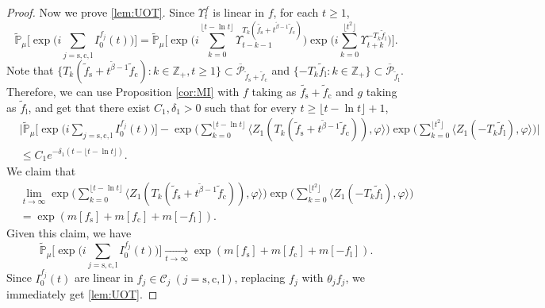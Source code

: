 \documentclass[12pt,a4paper]{amsart}
\theoremstyle{plain}
\theoremstyle{definition}
\numberwithin{equation}{section}
\begin{document}
\begin{proof}
	Now we prove \eqref{lem:UOT}.
	Since $\Upsilon_t^f$ is linear in $f$, for each $t\geq 1$,
\[
	\widetilde{\mathbb P}_{\mu}\Big[\exp\Big(i \sum_{j=\mathrm s,\mathrm c,\mathrm l}I_0^{f_j}(t)\Big)\Big]
	= \widetilde{\mathbb P}_{\mu}\Big[\exp\Big(i\sum_{k=0}^{\lfloor t-\ln t \rfloor}\Upsilon_{t-k-1}^{T_k(\tilde{f_\mathrm s}+t^{\tilde{\beta}-1} \tilde{f}_{\mathrm c})}\Big)\exp\Big(i\sum_{k=0}^{\lfloor t^2 \rfloor}\Upsilon_{t+k}^{-T_k\tilde{f}_{\mathrm l}}\Big)\Big].
\]
	Note that $\{T_k(\tilde f_\mathrm s + t^{\tilde\beta - 1}\tilde f_{\mathrm c}):k\in \mathbb Z_+, t\geq 1\}\subset \overline{\mathcal P}_{\tilde f_\mathrm s + \tilde f_{\mathrm c}}$ and $\{-T_k\tilde{f}_{\mathrm l}: k\in \mathbb Z_+\}\subset \overline{\mathcal P}_{\tilde f_\mathrm l}$.
	Therefore, we can use Proposition \ref{cor:MI} with $f$ taking as $\tilde{f_\mathrm s}+ \tilde{f}_{\mathrm c}$ and $g$ taking as $\tilde{f}_{\mathrm l}$, and get that there exist $C_1,\delta_1 > 0$ such that for every $t\geq \lfloor t - \ln t\rfloor +1$, 
  \begin{align}
    &\Big|\widetilde{\mathbb P}_{\mu}\Big[\exp\Big(i \sum_{j=\mathrm s,\mathrm c,\mathrm l}I_0^{f_j}(t)\Big)\Big]
    -\exp\Big(\sum_{k=0}^{\lfloor t-\ln t \rfloor} \langle Z_1(T_{k}(\tilde f_\mathrm s+t^{\tilde{\beta}-1}\tilde{f}_{\mathrm c})), \varphi\rangle \Big)\exp\Big(\sum_{k=0}^{\lfloor t^2 \rfloor}\langle Z_1(-T_k\tilde{f}_{\mathrm l}),\varphi\rangle\Big)\Big|\\
    &\leq C_1 e^{-\delta_1(t - \lfloor t - \ln t\rfloor)}.
  \end{align}
We claim that
\begin{align} \label{eq:UOT.1}
&\lim_{t\rightarrow\infty}\exp\Big(\sum_{k=0}^{\lfloor t-\ln t \rfloor} \langle Z_1(T_{k}(\tilde f_\mathrm s+t^{\tilde{\beta}-1}\tilde{f}_\mathrm c)), \varphi\rangle \Big)\exp\Big(\sum_{k=0}^{\lfloor t^2 \rfloor}\langle Z_1(-T_k\tilde{f}_\mathrm l),\varphi\rangle\Big)\\
& =\exp(m[f_\mathrm s]+m[f_\mathrm c]+m[-f_\mathrm l]).
\end{align}
Given this claim, we have
\[
	\widetilde{\mathbb P}_{\mu}\Big[\exp\Big(i \sum_{j=\mathrm s,\mathrm c,\mathrm l}I_0^{f_j}(t)\Big)\Big]
	 \xrightarrow[t\to \infty]{}
	 \exp(m[f_\mathrm s]+m[f_\mathrm c]+m[-f_\mathrm l]).
\]
	Since $I_0^{f_j}(t)$ are linear in $f_j \in \mathcal C_j~(j=\mathrm s,\mathrm c,\mathrm l)$, replacing $f_j$ with $\theta_j f_j$, we immediately get \eqref{lem:UOT}.


\end{proof}
\end{document}
